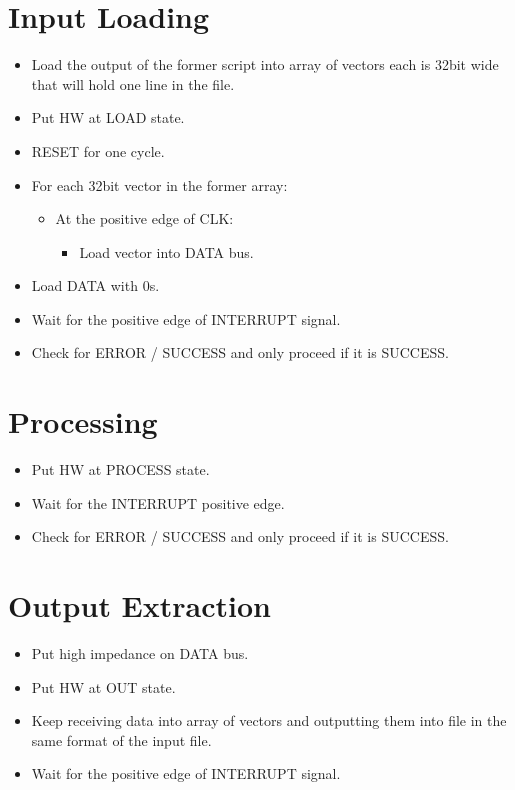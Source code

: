 \documentclass[12pt]{report}
\begin{document}
\section{Input Loading}
\begin{itemize}
    \item Load the output of the former script into array of vectors each is 32bit wide that will hold one line in the file.
    \item Put HW at LOAD state.
    \item RESET for one cycle.
    \item For each 32bit vector in the former array:
    \begin{itemize}
        \item At the positive edge of CLK:
        \begin{itemize}
            \item Load vector into DATA bus.
        \end{itemize}
    \end{itemize}
    \item Load DATA with 0s.
    \item Wait for the positive edge of INTERRUPT signal.
    \item Check for ERROR / SUCCESS and only proceed if it is SUCCESS.
\end{itemize}

\section{Processing}
\begin{itemize}
    \item Put HW at PROCESS state.
    \item Wait for the {INTERRUPT} positive edge.
    \item Check for {ERROR / SUCCESS} and only proceed if it is SUCCESS.
\end{itemize}

\section{Output Extraction}
\begin{itemize}
    \item Put high impedance on {DATA} bus.
    \item Put HW at OUT state.
    \item Keep receiving data into array of vectors and outputting them into file in the same format of the input file.
    \item Wait for the positive edge of {INTERRUPT} signal. 
\end{itemize}
\end{document}
